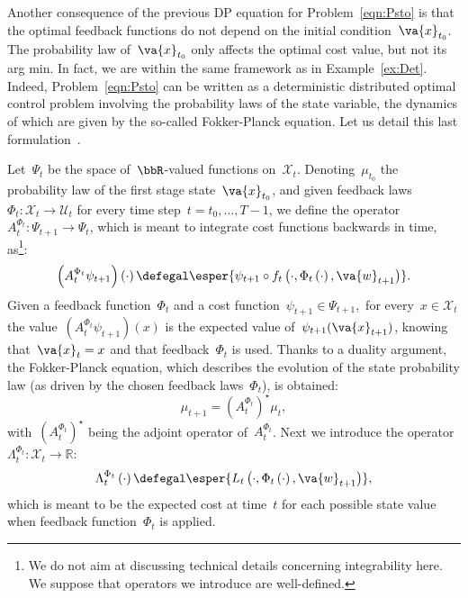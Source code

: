 \documentclass[a4paper]{amsart}
\theoremstyle{plain}
\theoremstyle{definition}
\theoremstyle{remark}
\begin{document}
Another consequence of the previous DP equation for
Problem~\eqref{eqn:Psto} is that the optimal feedback functions do
not depend on the initial condition~$\va{x}_{t_0}$. The
probability law of~$\va{x}_{t_0}$ only affects the optimal cost
value, but not its arg min. In fact, we are within the same
framework as in Example~\ref{ex:Det}. Indeed,
Problem~\eqref{eqn:Psto} can be written as a deterministic
distributed optimal control problem involving the probability laws
of the state variable, the dynamics of which are given by the
so-called Fokker-Planck equation. Let us detail this last
formulation~\citep[see][]{Witsenhausen:1973}.

Let~$\Psi_t$ be the space of~$\bbR$-valued functions
on~$\mathcal{X}_t$. Denoting~$\mu_{t_0}$ the probability law of
the first stage state~$\va{x}_{t_0}$, and given feedback
laws~$\Phi_t: \mathcal{X}_t \rightarrow \mathcal{U}_t$ for every
time step~$t=t_0, \dots, T-1$, we define the
operator~$A_t^{\Phi_t}: \Psi_{t+1} \rightarrow \Psi_t$, which is
meant to integrate cost functions backwards in time,
as\footnote{We do not aim at discussing technical details
concerning integrability here. We suppose that operators we
introduce are well-defined.}:
\begin{equation*}
\left(A_t^{\Phi_t} \psi_{t+1}\right)\left(\cdot\right) \defegal
\esper{\psi_{t+1} \circ f_t\left(\cdot, \Phi_t\left(\cdot\right),
\va{w}_{t+1}\right)}.
\end{equation*}
Given a feedback function~$\Phi_t$ and a cost function~$\psi_{t+1}
\in \Psi_{t+1}$,~for every~$x \in \mathcal{X}_t$ the
value~$(A_t^{\Phi_t} \psi_{t+1})(x)$ is the expected value
of~$\psi_{t+1}(\va{x}_{t+1})$, knowing that~$\va{x}_t=x$ and that
feedback~$\Phi_t$ is used. Thanks to a duality argument, the
Fokker-Planck equation, which describes the evolution of the state
probability law (as driven by the chosen feedback laws~$\Phi_t$),
is obtained:
\begin{equation*}
    \mu_{t+1} = \left(A_t^{\Phi_t}\right)^\star \mu_t,
\end{equation*}
with~$(A_t^{\Phi_t})^\star$ being the adjoint operator
of~$A_t^{\Phi_t}$. Next we introduce the operator
$\Lambda_t^{\Phi_t} : \mathcal{X}_t \rightarrow \mathbb{R}$:
\begin{equation*}
\Lambda_t^{\Phi_t}\left(\cdot\right) \defegal
\esper{L_t\left(\cdot, \Phi_t\left(\cdot\right),
\va{w}_{t+1}\right)},
\end{equation*}
which is meant to be the expected cost at time~$t$ for each
possible state value when feedback function~$\Phi_t$ is applied.
\end{document}
